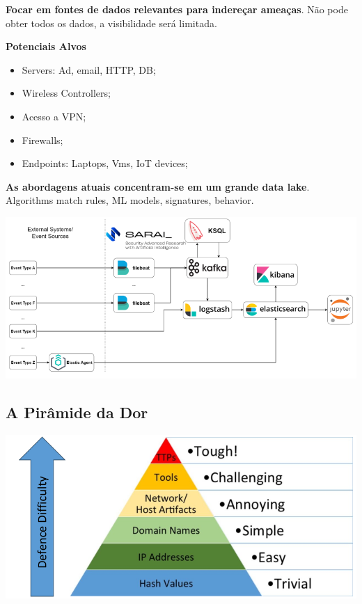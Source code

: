 \documentclass{article}
\begin{document}
\begin{flushleft}
  \textbf{Focar em fontes de dados relevantes para indereçar ameaças}. Não pode
  obter todos os dados, a visibilidade será limitada.

  \vspace{2mm}

  \textbf{Potenciais Alvos}
  \begin{itemize}
    \item Servers: Ad, email, HTTP, DB;
    \item Wireless Controllers;
    \item Acesso a VPN;
    \item Firewalls;
    \item Endpoints: Laptops, Vms, IoT devices;
  \end{itemize}

  \pagebreak

  \textbf{As abordagens atuais concentram-se em um grande data lake}.
  Algorithms match rules, ML models, signatures, behavior.

  \begin{center}
    \includegraphics[scale=0.4]{44}
  \end{center}
\end{flushleft}

\subsection{A Pirâmide da Dor}

\begin{center}
  \includegraphics[scale=0.4]{45}
\end{center}
\end{document}
